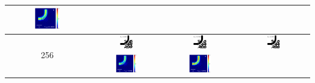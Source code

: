 \begin{table}[H]
\begin{tabular}{|c|c|c|c|}
      \includegraphics[width=0.33\textwidth]{image/results/bend/L-BFGS-B/visualize_field_fab_128.png} \\
    \hline
      \multirow{2}{*}{256} &
      \includegraphics[width=0.20\textwidth]{image/results/bend/L-BFGS-B/visualize_eps_cont_256.png} &
      \includegraphics[width=0.20\textwidth]{image/results/bend/L-BFGS-B/visualize_eps_disc_256.png} &
      \includegraphics[width=0.20\textwidth]{image/results/bend/L-BFGS-B/visualize_eps_fab_256.png} \\
      \cline{2-4}
      &
      \includegraphics[width=0.33\textwidth]{image/results/bend/L-BFGS-B/visualize_field_cont_256.png} &
      \includegraphics[width=0.33\textwidth]{image/results/bend/L-BFGS-B/visualize_field_disc_256.png} &

\end{tabular}
\end{table}
